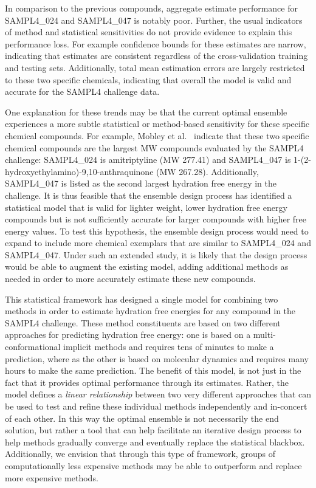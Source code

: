 \documentclass[journal=jpcbfk, manuscript=article]{achemso}
\newcommand{\+}[1]{\ensuremath{\mathbf{#1}}}
\begin{document}
In comparison to the previous compounds, aggregate estimate performance for SAMPL4\_024 and SAMPL4\_047 is notably poor.
Further, the usual indicators of method and statistical sensitivities do not provide evidence to explain this performance loss.
For example confidence bounds for these estimates are narrow, indicating that estimates are consistent regardless of the cross-validation training and testing sets.
Additionally, total mean estimation errors are largely restricted to these two specific chemicals, indicating that overall the model is valid and accurate for the SAMPL4 challenge data. 
 
One explanation for these trends may be that the current optimal ensemble experiences a more subtle statistical or method-based sensitivity for these specific chemical compounds. 
For example, Mobley et al.~\cite{Mobley:2014} indicate that these two specific chemical compounds are the largest MW compounds evaluated by the SAMPL4 challenge: SAMPL4\_024 is amitriptyline (MW 277.41) and SAMPL4\_047 is 1-(2-hydroxyethylamino)-9,10-anthraquinone (MW 267.28).
Additionally, SAMPL4\_047 is listed as the second largest hydration free energy in the challenge.
It is thus feasible that the ensemble design process has identified a statistical model that is valid for lighter weight, lower hydration free energy compounds but is not sufficiently accurate for larger compounds with higher free energy values.
To test this hypothesis, the ensemble design process would need to expand to include more chemical exemplars that are similar to SAMPL4\_024 and SAMPL4\_047. 
Under such an extended study, it is likely that the design process would be able to augment the existing model, adding additional methods as needed in order to more accurately estimate these new compounds.

This statistical framework has designed a single model for combining two methods in order to estimate hydration free energies for any compound in the SAMPL4 challenge.
These method constituents are based on two different approaches for predicting hydration free energy: one is based on a multi-conformational implicit methods and requires tens of minutes to make a prediction, where as the other is based on molecular dynamics and requires many hours to make the same prediction. 
The benefit of this model, is not just in the fact that it provides optimal performance through its estimates.
Rather, the model defines a \emph{linear relationship} between two very different approaches that can be used to test and refine these individual methods independently and in-concert of each other.
In this way the optimal ensemble is not necessarily the end solution, but rather a tool that can help facilitate an iterative design process to help methods  gradually converge and eventually replace the statistical blackbox.
Additionally, we envision that through this type of framework, groups of computationally less expensive methods may be able to outperform and replace more expensive methods.
\end{document}
